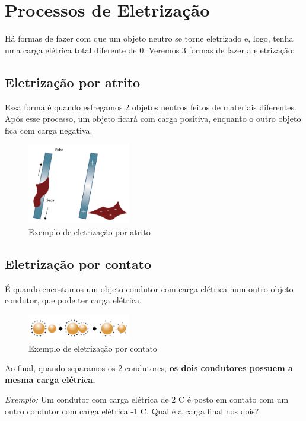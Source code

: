 \documentclass[12pt]{extarticle}
\newcommand{\<}{\langle}
\renewcommand{\>}{\rangle}
\theoremstyle{definition}
\begin{document}
\section{Processos de Eletrização}
Há formas de fazer com que um objeto neutro se torne eletrizado e, logo, tenha uma carga elétrica total diferente de 0. Veremos 3 formas de fazer a eletrização:

\subsection{Eletrização por atrito}
Essa forma é quando esfregamos 2 objetos neutros feitos de materiais diferentes. Após esse processo, um objeto ficará com carga positiva, enquanto o outro objeto fica com carga negativa.
\begin{figure}[H]
    \centering
    \includegraphics[width=0.4\textwidth]{eletrização-por-atrito.png}
    \caption{Exemplo de eletrização por atrito}
    \label{fig:ex_4}
\end{figure}

\subsection{Eletrização por contato}
É quando encostamos um objeto condutor com carga elétrica num outro objeto condutor, que pode ter carga elétrica.
\begin{figure}[H]
    \centering
    \includegraphics[width=0.4\textwidth]{eletrização-por-contato-positivamente-carregado.png}
    \caption{Exemplo de eletrização por contato}
    \label{fig:my_label}
\end{figure}

Ao final, quando separamos os 2 condutores, \textbf{os dois condutores possuem a mesma carga elétrica.}

\textit{Exemplo:} Um condutor com carga elétrica de 2 C é posto em contato com um outro condutor com carga elétrica -1 C. Qual é a carga final nos dois?
\end{document}
